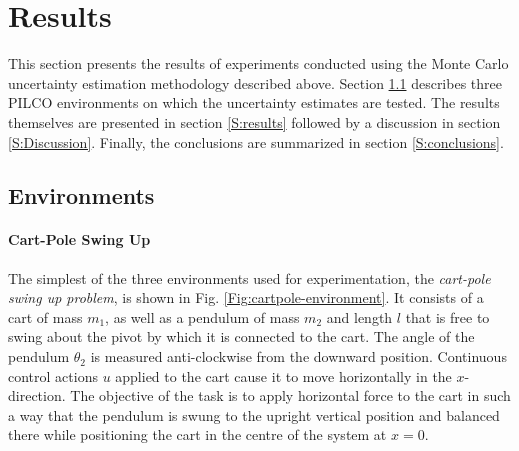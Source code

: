 \chapter{Results}

\ifpdf
    \graphicspath{{Chapter3/Figs/Raster/}{Chapter3/Figs/PDF/}{Chapter3/Figs/}}
\else
    \graphicspath{{Chapter3/Figs/Vector/}{Chapter3/Figures/}}
\fi
This section presents the results of experiments conducted using the Monte Carlo uncertainty estimation methodology described above. Section \ref{S:PILCO-environments} describes three PILCO environments on which the uncertainty estimates are tested. The results themselves are presented in section \ref{S:results} followed by a discussion in section \ref{S:Discussion}. Finally, the conclusions are summarized in section \ref{S:conclusions}. 
\section{Environments}
\label{S:PILCO-environments}


\subsubsection{Cart-Pole Swing Up}
The simplest of the three environments used for experimentation, the \textit{cart-pole swing up problem}, is shown in Fig. \ref{Fig:cartpole-environment}. It consists of a cart of mass $m_1$, as well as a pendulum of mass $m_2$ and length $l$ that is free to swing about the pivot by which it is connected to the cart. The angle of the pendulum $\theta_2$ is measured anti-clockwise from the downward position. Continuous control actions $u$ applied to the cart cause it to move horizontally in the $x$-direction. The objective of the task is to apply horizontal force to the cart in such a way that the pendulum is swung to the upright vertical position and balanced there while positioning the cart in the centre of the system at $x=0$.

